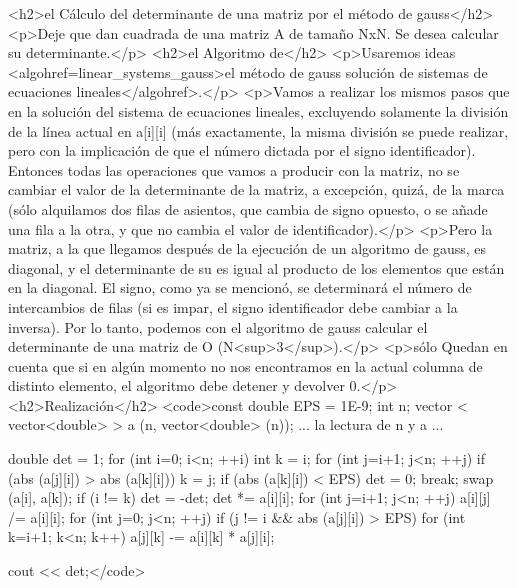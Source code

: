 <h2>el Cálculo del determinante de una matriz por el método de gauss</h2>
<p>Deje que dan cuadrada de una matriz A de tamaño NxN. Se desea calcular su determinante.</p>
<h2>el Algoritmo de</h2>
<p>Usaremos ideas <algohref=linear_systems_gauss>el método de gauss solución de sistemas de ecuaciones lineales</algohref>.</p>
<p>Vamos a realizar los mismos pasos que en la solución del sistema de ecuaciones lineales, excluyendo solamente la división de la línea actual en a[i][i] (más exactamente, la misma división se puede realizar, pero con la implicación de que el número dictada por el signo identificador). Entonces todas las operaciones que vamos a producir con la matriz, no se cambiar el valor de la determinante de la matriz, a excepción, quizá, de la marca (sólo alquilamos dos filas de asientos, que cambia de signo opuesto, o se añade una fila a la otra, y que no cambia el valor de identificador).</p>
<p>Pero la matriz, a la que llegamos después de la ejecución de un algoritmo de gauss, es diagonal, y el determinante de su es igual al producto de los elementos que están en la diagonal. El signo, como ya se mencionó, se determinará el número de intercambios de filas (si es impar, el signo identificador debe cambiar a la inversa). Por lo tanto, podemos con el algoritmo de gauss calcular el determinante de una matriz de O (N<sup>3</sup>).</p>
<p>sólo Quedan en cuenta que si en algún momento no nos encontramos en la actual columna de distinto elemento, el algoritmo debe detener y devolver 0.</p>
<h2>Realización</h2>
<code>const double EPS = 1E-9;
int n;
vector < vector<double> > a (n, vector<double> (n));
... la lectura de n y a ...

double det = 1;
for (int i=0; i<n; ++i) {
int k = i;
for (int j=i+1; j<n; ++j)
if (abs (a[j][i]) > abs (a[k][i]))
k = j;
if (abs (a[k][i]) < EPS) {
det = 0;
break;
}
swap (a[i], a[k]);
if (i != k)
det = -det;
det *= a[i][i];
for (int j=i+1; j<n; ++j)
a[i][j] /= a[i][i];
for (int j=0; j<n; ++j)
if (j != i && abs (a[j][i]) > EPS)
for (int k=i+1; k<n; k++)
a[j][k] -= a[i][k] * a[j][i];
}

cout << det;</code>